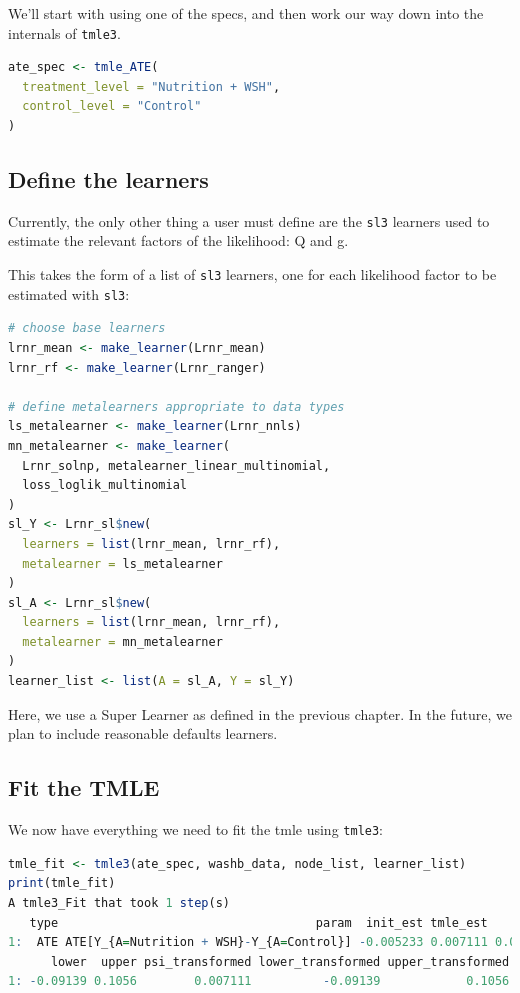 \documentclass[
  12pt, krantz2,
]{krantz}
\newcommand{\passthrough}[1]{#1}
\newcommand{\1}{\mathbbm{1}}
\theoremstyle{definition}
\theoremstyle{definition}
\theoremstyle{definition}
\theoremstyle{definition}
\theoremstyle{remark}
\begin{document}
We'll start with using one of the specs, and then work our way down into the
internals of \passthrough{\lstinline!tmle3!}.

\begin{lstlisting}[language=R]
ate_spec <- tmle_ATE(
  treatment_level = "Nutrition + WSH",
  control_level = "Control"
)
\end{lstlisting}

\hypertarget{define-the-learners}{%
\subsection{Define the learners}\label{define-the-learners}}

Currently, the only other thing a user must define are the \passthrough{\lstinline!sl3!} learners used
to estimate the relevant factors of the likelihood: Q and g.

This takes the form of a list of \passthrough{\lstinline!sl3!} learners, one for each likelihood factor
to be estimated with \passthrough{\lstinline!sl3!}:

\begin{lstlisting}[language=R]
# choose base learners
lrnr_mean <- make_learner(Lrnr_mean)
lrnr_rf <- make_learner(Lrnr_ranger)

# define metalearners appropriate to data types
ls_metalearner <- make_learner(Lrnr_nnls)
mn_metalearner <- make_learner(
  Lrnr_solnp, metalearner_linear_multinomial,
  loss_loglik_multinomial
)
sl_Y <- Lrnr_sl$new(
  learners = list(lrnr_mean, lrnr_rf),
  metalearner = ls_metalearner
)
sl_A <- Lrnr_sl$new(
  learners = list(lrnr_mean, lrnr_rf),
  metalearner = mn_metalearner
)
learner_list <- list(A = sl_A, Y = sl_Y)
\end{lstlisting}

Here, we use a Super Learner as defined in the previous chapter. In the future,
we plan to include reasonable defaults learners.

\hypertarget{fit-the-tmle}{%
\subsection{Fit the TMLE}\label{fit-the-tmle}}

We now have everything we need to fit the tmle using \passthrough{\lstinline!tmle3!}:

\begin{lstlisting}[language=R]
tmle_fit <- tmle3(ate_spec, washb_data, node_list, learner_list)
print(tmle_fit)
A tmle3_Fit that took 1 step(s)
   type                                    param  init_est tmle_est      se
1:  ATE ATE[Y_{A=Nutrition + WSH}-Y_{A=Control}] -0.005233 0.007111 0.05025
      lower  upper psi_transformed lower_transformed upper_transformed
1: -0.09139 0.1056        0.007111          -0.09139            0.1056
\end{lstlisting}
\end{document}
